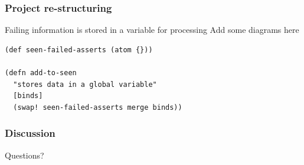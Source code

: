 \documentclass{beamer}
\begin{document}
\begin{frame}[fragile]
  \frametitle{Project re-structuring}
Failing information is stored in a variable for processing
Add some diagrams here
\begin{verbatim}
(def seen-failed-asserts (atom {}))

(defn add-to-seen
  "stores data in a global variable"
  [binds]
  (swap! seen-failed-asserts merge binds))
\end{verbatim}
\end{frame}

\begin{frame}
  \frametitle{Discussion}
Questions?
\end{frame}
\end{document}

